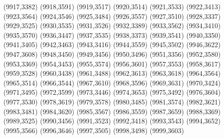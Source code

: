 (9917,3382)
(9918,3591)
(9919,3517)
(9920,3514)
(9921,3533)
(9922,3413)
(9923,3564)
(9924,3546)
(9925,3484)
(9926,3557)
(9927,3510)
(9928,3337)
(9929,3525)
(9930,3535)
(9931,3526)
(9932,3389)
(9933,3562)
(9934,3410)
(9935,3570)
(9936,3447)
(9937,3535)
(9938,3373)
(9939,3541)
(9940,3350)
(9941,3405)
(9942,3463)
(9943,3416)
(9944,3559)
(9945,3502)
(9946,3622)
(9947,3608)
(9948,3450)
(9949,3456)
(9950,3496)
(9951,3356)
(9952,3580)
(9953,3369)
(9954,3453)
(9955,3574)
(9956,3601)
(9957,3553)
(9958,3617)
(9959,3528)
(9960,3438)
(9961,3488)
(9962,3613)
(9963,3618)
(9964,3564)
(9965,3514)
(9966,3544)
(9967,3610)
(9968,3596)
(9969,3631)
(9970,3424)
(9971,3495)
(9972,3599)
(9973,3446)
(9974,3653)
(9975,3492)
(9976,3604)
(9977,3530)
(9978,3619)
(9979,3578)
(9980,3485)
(9981,3574)
(9982,3621)
(9983,3481)
(9984,3620)
(9985,3567)
(9986,3559)
(9987,3659)
(9988,3369)
(9989,3525)
(9990,3456)
(9991,3523)
(9992,3418)
(9993,3543)
(9994,3652)
(9995,3566)
(9996,3646)
(9997,3505)
(9998,3498)
(9999,3603)
